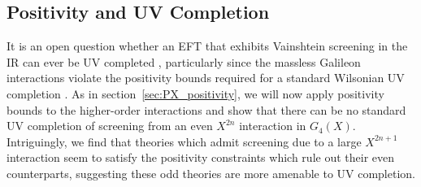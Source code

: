 \documentclass[11pt]{article}
\begin{document}
\subsection{Positivity and UV Completion}
\label{sec:positivity}

It is an open question whether an EFT that exhibits Vainshtein screening in the IR can ever be UV completed \cite{Kaloper:2014vqa, Keltner:2015xda, Padilla:2017wth, deRham:2017imi, deRham:2017xox, Burrage:2020bxp}, particularly since the massless Galileon interactions violate the positivity bounds required for a standard Wilsonian UV completion \cite{Adams:2006sv}.
As in section~\ref{sec:PX_positivity}, we will now apply positivity bounds to the higher-order interactions and show that there can be no standard UV completion of screening from an even $X^{2n}$ interaction in $G_4 (X)$. 
Intriguingly, we find that theories which admit screening due to a large $X^{2n+1}$ interaction seem to satisfy the positivity constraints which rule out their even counterparts, suggesting these odd theories are more amenable to UV  completion. 


\end{document}
